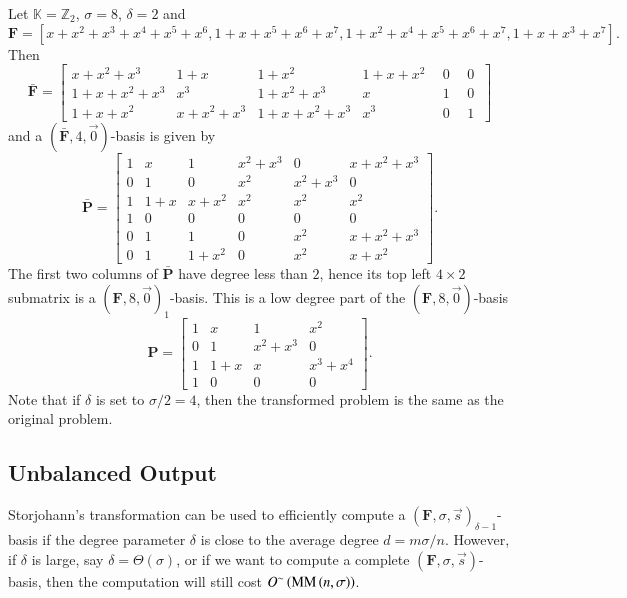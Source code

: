 \begin{exmp}
\label{exm:StorjohannTransformation}Let $\mathbb{K}=\mathbb{Z}_{2}$,
$\sigma=8$, $\delta=2$ and \[
\mathbf{F}=[x+x^{2}+x^{3}+x^{4}+x^{5}+x^{6},1+x+x^{5}+x^{6}+x^{7},1+x^{2}+x^{4}+x^{5}+x^{6}+x^{7},1+x+x^{3}+x^{7}].\]
 Then \[
\bar{\mathbf{F}}=\left[{\begin{array}{cccccc}
x+x^{2}+x^{3} & 1+x & 1+x^{2} & 1+x+x^{2} & ~~0~ & ~0~\\
1+x+x^{2}+x^{3} & x^{3} & 1+x^{2}+x^{3} & x & ~~1~ & ~0~\\
1+x+x^{2} & x+x^{2}+x^{3} & 1+x+x^{2}+x^{3} & x^{3} & ~~0~ & ~1~\end{array}}\right]\]
 and a $\left(\bar{\mathbf{F}},4,\vec{0}\right)$-basis is given by
\[
\bar{\mathbf{P}}=\left[{\begin{array}{rc|cccc}
1 & x & 1 & x^{2}+x^{3} & 0 & x+x^{2}+x^{3}\\
0 & 1 & 0 & x^{2} & x^{2}+x^{3} & 0\\
1 & 1+x & x+x^{2} & x^{2} & x^{2} & x^{2}\\
1 & 0 & 0 & 0 & 0 & 0\\
\hline 0 & 1 & 1 & 0 & x^{2} & x+x^{2}+x^{3}\\
0 & 1 & 1+x^{2} & 0 & x^{2} & x+x^{2}\end{array}}\right].\]
 The first two columns of $\bar{\mathbf{P}}$ have degree less than
$2$, hence its top left $4\times2$ submatrix is a $\left(\mathbf{F},8,\vec{0}\right)_{1}$-basis.
This is a low degree part of the\textbf{ $(\mathbf{F},8,\vec{0})$}-basis\[
\mathbf{P}=\begin{bmatrix}1 & x & 1 & x^{2}\\
0 & 1 & x^{2}+x^{3} & 0\\
1 & 1+x & x & x^{3}+x^{4}\\
1 & 0 & 0 & 0\end{bmatrix}.\]
 Note that if $\delta$ is set to $\sigma/2=4$, then the transformed
problem is the same as the original problem. 
\end{exmp}

\subsection{\label{sub:Unbalanced-Output}Unbalanced Output }

Storjohann's transformation can be used to efficiently compute a $\left(\mathbf{F},\sigma,\vec{s}\right)_{\delta-1}$-basis
if the degree parameter $\delta$ is close to the average degree $d=m\sigma/n$.
However, if $\delta$ is large, say $\delta=\Theta\left(\sigma\right)$,
or if we want to compute a complete $\left(\mathbf{F},\sigma,\vec{s}\right)$-basis,
then the computation will still cost $O^{\sim}\left(\MM\left(n,\sigma\right)\right)$.

